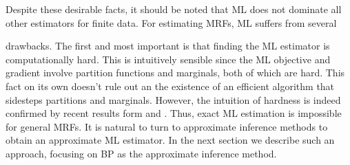 Despite these desirable facts, it should be noted that ML does not dominate all other estimators for finite data.
For estimating MRFs, ML suffers from several  drawbacks. The first and most important is that finding the ML estimator is computationally hard. This is intuitively sensible since the ML objective and gradient involve partition functions and marginals, both of which are hard. This fact on its own doesn't rule out an the existence of an efficient algorithm that sidesteps partitions and marginals.
However, the intuition of hardness is indeed confirmed by recent results form \cite{bresler2014hardness} and \cite{montanari2015computational}.
Thus, exact ML estimation is impossible for general MRFs.
It is natural to turn to approximate inference methods to obtain an approximate ML estimator.
In the next section we describe such an approach, focusing on BP as the approximate inference method.

